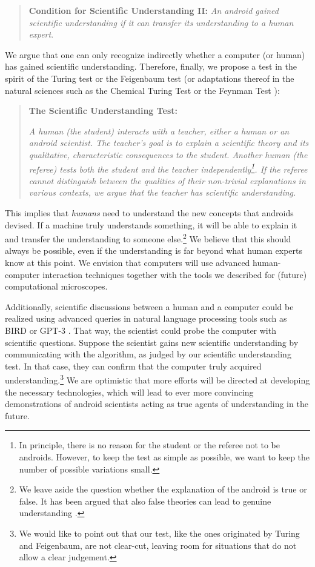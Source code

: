 \begin{quote}
\textbf{Condition for Scientific Understanding II:}
\textit{An android gained scientific understanding if it can transfer its understanding to a human expert}.
\end{quote}

We argue that one can only recognize indirectly whether a computer (or human) has gained scientific understanding. Therefore, finally, we propose a test in the spirit of the Turing test \cite{turing1950computing} or the Feigenbaum test\cite{feigenbaum2003some} (or adaptations thereof in the natural sciences such as the Chemical Turing Test or the Feynman Test \cite{aspuru2018matter}):

\begingroup

\begin{quote}
\textbf{The Scientific Understanding Test:}

\textit{A human (the student) interacts with a teacher, either a human or an android scientist. The teacher's goal is to explain a scientific theory and its qualitative, characteristic consequences to the student. Another human (the referee) tests both the student and the teacher independently\footnote{In principle, there is no reason for the student or the referee not to be androids. However, to keep the test as simple as possible, we want to keep the number of possible variations small.}. If the referee cannot distinguish between the qualities of their non-trivial explanations in various contexts, we argue that the teacher has scientific understanding.}
\end{quote}
\endgroup


This implies that \textit{humans} need to understand the new concepts that androids devised. If a machine truly understands something, it will be able to explain it and transfer the understanding to someone else.\footnote{We leave aside the question whether the explanation of the android is true or false. It has been argued that also false theories can lead to genuine understanding \cite{de2017false}.} We believe that this should always be possible, even if the understanding is far beyond what human experts know at this point. We envision that computers will use advanced human-computer interaction techniques together with the tools we described for (future) computational microscopes.

Additionally, scientific discussions between a human and a computer could be realized using advanced queries in natural language processing tools such as BIRD \cite{devlin2018bert} or GPT-3 \cite{brown2020language}. That way, the scientist could probe the computer with scientific questions. Suppose the scientist gains new scientific understanding by communicating with the algorithm, as judged by our scientific understanding test. In that case, they can confirm that the computer truly acquired understanding.\footnote{We would like to point out that our test, like the ones originated by Turing and Feigenbaum, are not clear-cut, leaving room for situations that do not allow a clear judgement.} We are optimistic that more efforts will be directed at developing the necessary technologies, which will lead to ever more convincing demonstrations of android scientists acting as true agents of understanding in the future.



